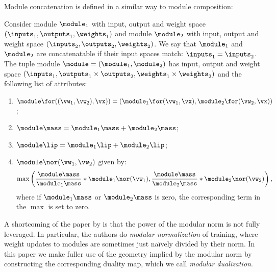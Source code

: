 Module concatenation is defined in a similar way to module composition:
\begin{mydefinition}\label{def:concatenation} Consider module $\module_1$ with input, output and weight space $(\inputs_1,\outputs_1,\weights_1)$ and module $\module_2$ with input, output and weight space $(\inputs_2,\outputs_2,\weights_2)$. We say that $\module_1$ and $\module_2$ are concatenatable if their input spaces match: $\inputs_1 = \inputs_2$. The tuple module $\module=(\module_1,\module_2)$ has input, output and weight space $(\inputs_1, \outputs_1\times\outputs_2, \weights_1\times\weights_2)$ and the following list of attributes:
\begin{enumerate}[label=\normalfont(\alph*)]
\setlength\itemsep{0em}
\item $\module\for((\vw_1,\vw_2),\vx)) = (\module_1\for(\vw_1,\vx), \module_2\for(\vw_2,\vx))$;%
\item $\module\mass = \module_1\mass + \module_2\mass$;%
\item $\module\lip = \module_1\lip + \module_2\lip$;%
\item $\module\nor(\vw_1, \vw_2)$ given by:
\begin{equation*}\label{eq:norm_addition}
    \max\left(
    \frac{\module\mass}{\module_1\mass} * \module_1\nor(\vw_1),
    \frac{\module\mass}{\module_2\mass} * \module_2\nor(\vw_2)\right),
\end{equation*}
where if $\module_1\mass$ or $\module_2\mass$ is zero, the corresponding term in the $\max$ is set to zero.
\end{enumerate}
\end{mydefinition}

A shortcoming of the paper by \citet{modula} is that the power of the modular norm is not fully leveraged. In particular, the authors do \textit{modular normalization} of training, where weight updates to modules are sometimes just na\"ively divided by their norm. In this paper we make fuller use of the geometry implied by the modular norm by constructing the corresponding duality map, which we call \textit{modular dualization}.
